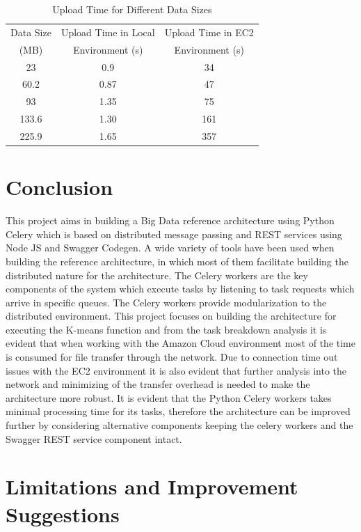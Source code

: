 \begin{table}[htbp]
	\centering
	\caption{Upload Time for Different Data 
	Sizes}\label{tbl:datasizestimebreakdown}
	\begin{tabular}{*{3}{c}}
		\toprule
		Data Size & Upload Time in Local & Upload Time in EC2 \\
		(MB) & Environment (s) & Environment (s) \\
		\midrule
		23    &   0.9    &  34  \\ \midrule
		60.2  &   0.87   &  47  \\ \midrule
		93    &   1.35   &  75  \\ \midrule
		133.6 &   1.30   &  161 \\ \midrule
		225.9 &   1.65   &  357 \\
		\bottomrule
	\end{tabular}
\end{table}

\section{Conclusion}

This project aims in building a Big Data reference architecture using Python 
Celery which is based on distributed message passing and REST services using 
Node JS and Swagger Codegen. A wide variety of tools have been used when 
building the reference architecture, in which most of them facilitate building 
the distributed nature for the architecture. The Celery workers are the key 
components of the system which execute tasks by listening to task requests 
which arrive in specific queues. The Celery workers provide modularization to 
the distributed environment. This project focuses on building the 
architecture for executing the K-means function and from the task breakdown 
analysis it is evident that when working with the Amazon Cloud environment 
most of the time is consumed for file transfer through the network. Due to 
connection time out issues with the EC2 environment it is also evident that 
further analysis into the network and minimizing of the transfer overhead is 
needed to make the architecture more robust. It is evident that the Python 
Celery workers takes minimal processing time for its tasks, therefore the 
architecture can be improved further by considering alternative components 
keeping the celery workers and the Swagger REST service component intact.
 
\section{Limitations and Improvement Suggestions}

